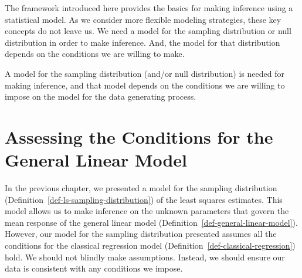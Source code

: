 \documentclass[
  letterpaper,
  DIV=11,
  numbers=noendperiod]{scrreprt}
\theoremstyle{definition}
\theoremstyle{definition}
\theoremstyle{remark}
\begin{document}
The framework introduced here provides the basics for making inference
using a statistical model. As we consider more flexible modeling
strategies, these key concepts do not leave us. We need a model for the
sampling distribution or null distribution in order to make inference.
And, the model for that distribution depends on the conditions we are
willing to make.

\begin{tcolorbox}[enhanced jigsaw, bottomrule=.15mm, titlerule=0mm, bottomtitle=1mm, colback=white, coltitle=black, rightrule=.15mm, leftrule=.75mm, toprule=.15mm, toptitle=1mm, left=2mm, opacityback=0, colframe=quarto-callout-tip-color-frame, breakable, title=\textcolor{quarto-callout-tip-color}{\faLightbulb}\hspace{0.5em}{Big Idea}, arc=.35mm, colbacktitle=quarto-callout-tip-color!10!white, opacitybacktitle=0.6]

A model for the sampling distribution (and/or null distribution) is
needed for making inference, and that model depends on the conditions we
are willing to impose on the model for the data generating process.

\end{tcolorbox}

\hypertarget{sec-glm-assessing-conditions}{%
\chapter{Assessing the Conditions for the General Linear
Model}\label{sec-glm-assessing-conditions}}

\providecommand{\norm}[1]{\lVert#1\rVert}
\providecommand{\abs}[1]{\lvert#1\rvert}
\providecommand{\dist}[1]{\stackrel{\text{#1}}{\sim}}
\providecommand{\ind}[1]{\mathbb{I}\left(#1\right)}
\providecommand{\bm}[1]{\mathbf{#1}}
\providecommand{\bs}[1]{\boldsymbol{#1}}
\providecommand{\Ell}{\mathcal{L}}
\providecommand{\indep}{\perp\negthickspace\negmedspace\perp}

In the previous chapter, we presented a model for the sampling
distribution (Definition~\ref{def-ls-sampling-distribution}) of the
least squares estimates. This model allows us to make inference on the
unknown parameters that govern the mean response of the general linear
model (Definition~\ref{def-general-linear-model}). However, our model
for the sampling distribution presented assumes all the conditions for
the classical regression model
(Definition~\ref{def-classical-regression}) hold. We should not blindly
make assumptions. Instead, we should ensure our data is consistent with
any conditions we impose.
\end{document}
